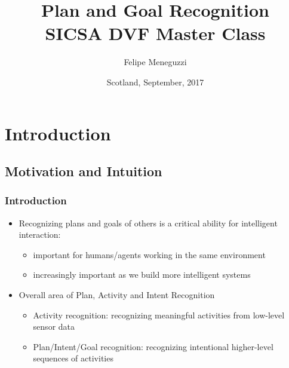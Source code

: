 \documentclass{beamer}
\title[\fontsize{0.08cm}{1em}\selectfont Plan and Goal Recognition]{Plan and Goal Recognition \\ SICSA DVF Master Class}
\author[Meneguzzi]{Felipe Meneguzzi\dag
}
\institute[]{\dag Pontifical Catholic University of Rio Grande do Sul, Brazil
\\
\url{felipe.meneguzzi@pucrs.br}
}
\date{Scotland, September, 2017}
\begin{document}

    \begin{frame}
        \titlepage
    \end{frame}
    
\section{Introduction}

\subsection{Motivation and Intuition}

	\begin{frame}[c]\frametitle{Introduction}
		\begin{itemize}
			\item Recognizing plans and goals of others is a critical ability for intelligent interaction:
			\begin{itemize}
				\item important for humans/agents working in the same environment
				\item increasingly important as we build more intelligent systems
			\end{itemize}
			\item Overall area of Plan, Activity and Intent Recognition
			\begin{itemize}
				\item Activity recognition: recognizing meaningful activities from low-level sensor data
				\item Plan/Intent/Goal recognition: recognizing intentional higher-level sequences of activities 
			\end{itemize}
		\end{itemize}
	\end{frame}
\end{document}
